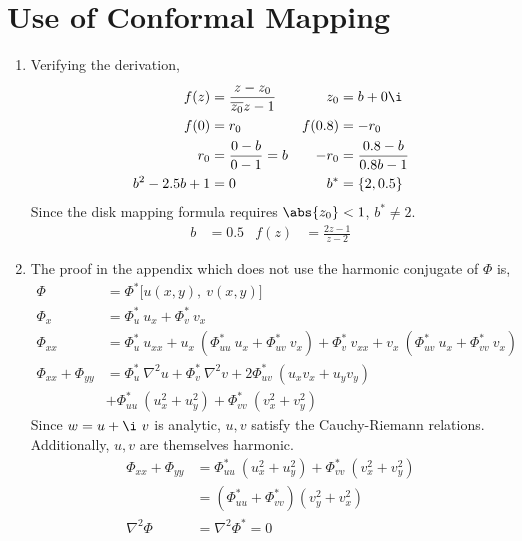 \section{Use of Conformal Mapping}

\begin{enumerate}
    \item Verifying the derivation,
          \begin{align}
              f(z)           & = \frac{z  - z_0}{\overline{z_0} z - 1} &
              z_0            & = b + 0\i                                 \\
              f(0)           & = r_0                                   &
              f(0.8)         & = -r_0                                    \\
              r_0            & = \frac{0 - b}{0 - 1} = b               &
              -r_0           & = \frac{0.8 - b}{0.8b - 1}                \\
              b^2 - 2.5b + 1 & = 0                                     &
              b^*            & = \{2, 0.5\}
          \end{align}
          Since the disk mapping formula requires $ \abs{z_0} < 1 $, $ b^* \neq 2 $.
          \begin{align}
              b & = 0.5 & f(z) & = \frac{2z - 1}{z - 2}
          \end{align}

    \item The proof in the appendix which does not use the harmonic conjugate of
          $ \Phi $ is,
          \begin{align}
              \Phi                  & = \Phi^*\Big[ u(x, y),\ v(x, y) \Big]         \\
              \Phi_x                & = \Phi^*_u\ u_x + \Phi^*_v\ v_x               \\
              \Phi_{xx}             & = \Phi^*_u\ u_{xx} +  u_x\ (\Phi^*_{uu}\ u_x
              + \Phi^*_{uv}\ v_x)
              + \Phi^*_v\ v_{xx} +  v_x\ (\Phi^*_{uv}\ u_x + \Phi^*_{vv}\ v_x)      \\
              \Phi_{xx} + \Phi_{yy} & = \Phi^*_u\ \nabla^2 u + \Phi^*_v\ \nabla^2 v
              + 2\Phi^*_{uv}\ (u_xv_x + u_yv_y)                                     \\
                                    & + \Phi^*_{uu}\ (u_x^2 + u_y^2) + \Phi^*_{vv}
              \ (v_x^2 + v_y^2)
          \end{align}
          Since $ w = u + \i\ v $ is analytic, $ u, v $ satisfy the Cauchy-Riemann
          relations. Additionally, $ u, v $ are themselves harmonic.
          \begin{align}
              \Phi_{xx} + \Phi_{yy} & = \Phi^*_{uu}\ (u_x^2 + u_y^2) + \Phi^*_{vv}
              \ (v_x^2 + v_y^2)                                                    \\
                                    & = (\Phi^*_{uu} + \Phi^*_{vv})(v_y^2 + v_x^2) \\
              \nabla^2 \Phi         & = \nabla^2 \Phi^* = 0
          \end{align}


\end{enumerate}

